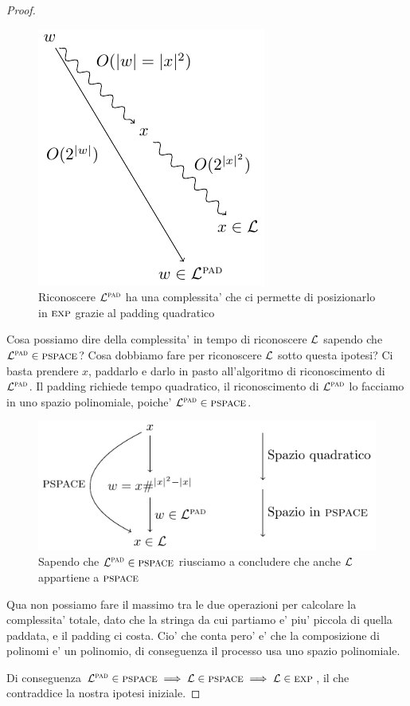 \begin{proof}
    \begin{figure}[h]
        \begin{center}
            \includegraphics{./img/timespacehierarchies/PaddingCheat.pdf}
            \caption{Riconoscere $\mathcal{L}^{\textsc{pad}}$ ha una complessita' che ci permette di posizionarlo in
            $\textsc{exp}$ grazie al padding quadratico}
        \end{center}
    \end{figure}

    Cosa possiamo dire della complessita' in tempo di riconoscere $\mathcal{L}$ sapendo che $\mathcal{L}^{\textsc{pad}} \in
    \textsc{pspace}$? Cosa dobbiamo fare per riconoscere $\mathcal{L}$ sotto questa ipotesi? Ci basta prendere
    $x$, paddarlo e darlo in pasto all'algoritmo di riconoscimento di $\mathcal{L}^{\textsc{pad}}$. Il padding richiede
    tempo quadratico, il riconoscimento di $\mathcal{L}^{\textsc{pad}}$ lo facciamo in uno spazio polinomiale, poiche'
    $\mathcal{L}^{\textsc{pad}} \in \textsc{pspace}$.

    \begin{figure}[h]
        \begin{center}
            \includegraphics{./img/timespacehierarchies/LPadComplexity.pdf}
            \caption{Sapendo che $\mathcal{L}^{\textsc{pad}} \in \textsc{pspace}$ riusciamo a concludere che anche $\mathcal{L}$
            appartiene a $\textsc{pspace}$}
        \end{center}
    \end{figure}

    Qua non possiamo fare il massimo tra le due operazioni per calcolare la complessita' totale,
    dato che la stringa da cui partiamo e' piu' piccola di quella paddata, e il padding ci costa.
    Cio' che conta pero' e' che la composizione di polinomi e' un polinomio, di conseguenza il
    processo usa uno spazio polinomiale.

    Di conseguenza $\mathcal{L}^{\textsc{pad}} \in \textsc{pspace} \implies \mathcal{L} \in \textsc{pspace} \implies \mathcal{L} \in \textsc{exp}$, il che
    contraddice la nostra ipotesi iniziale.
\end{proof}

